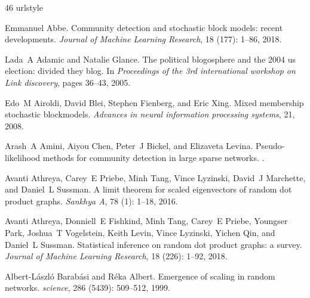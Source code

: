 \documentclass[12pt]{article}
\newcommand{\1}{\mathbf{1}}
\begin{document}
\renewcommand{\refname}{References}
\begin{thebibliography}{46}
\providecommand{\natexlab}[1]{#1}
\providecommand{\url}[1]{\texttt{#1}}
\expandafter\ifx\csname urlstyle\endcsname\relax
  \providecommand{\doi}[1]{doi: #1}\else
  \providecommand{\doi}{doi: \begingroup \urlstyle{rm}\Url}\fi

Emmanuel Abbe.
\newblock Community detection and stochastic block models: recent developments.
\newblock \emph{Journal of Machine Learning Research}, 18
  (177): 1--86, 2018.

Lada~A Adamic and Natalie Glance.
\newblock The political blogosphere and the 2004 us election: divided they
  blog.
\newblock In \emph{Proceedings of the 3rd international workshop on Link
  discovery}, pages 36--43, 2005.

Edo~M Airoldi, David Blei, Stephen Fienberg, and Eric Xing.
\newblock Mixed membership stochastic blockmodels.
\newblock \emph{Advances in neural information processing systems}, 21, 2008.

Arash~A Amini, Aiyou Chen, Peter~J Bickel, and Elizaveta Levina.
\newblock Pseudo-likelihood methods for community detection in large sparse
  networks.
.

Avanti Athreya, Carey~E Priebe, Minh Tang, Vince Lyzinski, David~J Marchette,
  and Daniel~L Sussman.
\newblock A limit theorem for scaled eigenvectors of random dot product graphs.
\newblock \emph{Sankhya A}, 78 (1): 1--18, 2016.

Avanti Athreya, Donniell~E Fishkind, Minh Tang, Carey~E Priebe, Youngser Park,
  Joshua~T Vogelstein, Keith Levin, Vince Lyzinski, Yichen Qin, and Daniel~L
  Sussman.
\newblock Statistical inference on random dot product graphs: a survey.
\newblock \emph{Journal of Machine Learning Research}, 18
  (226): 1--92, 2018.

Albert-L{\'a}szl{\'o} Barab{\'a}si and R{\'e}ka Albert.
\newblock Emergence of scaling in random networks.
\newblock \emph{science}, 286 (5439): 509--512, 1999.


\end{thebibliography}
\end{document}
